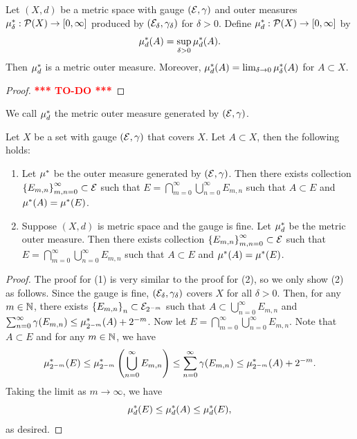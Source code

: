 \documentclass[a4paper]{article}
\newcommand{\TODO}{\textcolor{red}{\textbf{*** TO-DO ***}}}
\renewcommand{\cupinfn}{\bigcup_{n=0}^\infty}
\renewcommand{\suminfn}{\sum_{n=0}^\infty}
\renewcommand{\capinfm}{\bigcap_{m=0}^\infty}
\begin{document}
\begin{thm}
  Let $(X, d)$ be a metric space with gauge $(\mathcal{E}, \gamma)$ and outer
  measures $\mu^*_\delta: \mathcal{P}(X) \to [0, \infty]$ produced by $(\mathcal{E}_\delta,
    \gamma_\delta)$ for $\delta > 0$. Define $\mu^*_d : \mathcal{P}(X) \to [0, \infty]$
  by
  \[
    \mu^*_d(A) = \sup_{\delta > 0} \mu^*_d (A).
  \]
  Then $\mu^*_d$ is a metric outer measure. Moreover, $\mu^*_d(A) =
  \lim_{\delta \to 0} \mu^*_\delta(A)$ for $A \subset X$.
\end{thm}

\begin{proof}
  \TODO
\end{proof}

\begin{defi}
  We call $\mu^*_d$ the metric outer measure generated by $(\mathcal{E}, \gamma)$.
\end{defi}

\begin{lemma}
  Let $X$ be a set with gauge $(\mathcal{E}, \gamma)$ that covers $X$. Let $A
    \subset X$, then the following holds:
  \begin{enumerate}
    \item Let $\mu^*$ be the outer measure generated by $(\mathcal{E}, \gamma)$.
          Then there exists collection $\left\{ E_{m,n} \right\}_{m, n=
          0}^\infty \subset \mathcal{E}$ such that $E = \capinfm \cupinfn E_{m,
          n}$ such that $A \subset E$ and $\mu^*(A) = \mu^*(E)$.

    \item Suppose $(X, d)$ is metric space and the gauge is fine. Let
          $\mu^*_d$ be the metric outer measure. Then there exists
          collection $\left\{ E_{m,n} \right\}_{m, n= 0}^\infty \subset
          \mathcal{E}$ such that $E = \capinfm \cupinfn E_{m, n}$ such that $A
          \subset E$ and $\mu^*(A) = \mu^*(E)$.
  \end{enumerate}
\end{lemma}

\begin{proof}
  The proof for (1) is very similar to the proof for (2), so we only show
  (2) as follows. Since the gauge is fine, $(\mathcal{E}_\delta, \gamma_\delta)$
  covers $X$ for all $\delta > 0$. Then, for any $m \in \mathbb{N}$, there exists
  $\left\{ E_{m, n} \right\}_{n} \subset \mathcal{E}_{2^{-m}}$ such that $A
    \subset \cupinfn E_{m, n}$ and $\suminfn \gamma(E_{m, n}) \leq
    \om_{2^{-m}}(A) + 2^{-m}$. Now let $E = \capinfm \cupinfn E_{m, n}$.
  Note that $A \subset E$ and for any $m \in \mathbb{N}$, we have
  \[
    \om_{2^{-m}} (E) \leq \om_{2^{-m}} \left( \cupinfn E_{m, n} \right)
    \leq \suminfn \gamma(E_{m, n}) \leq \om_{2^{-m}} (A) + 2^{-m}.
  \]
  Taking the limit as $m \to \infty$, we have
  \[
    \mu^*_d (E) \leq \mu^*_d(A) \leq \mu^*_d(E),
  \]
  as desired.

\end{proof}
\end{document}
